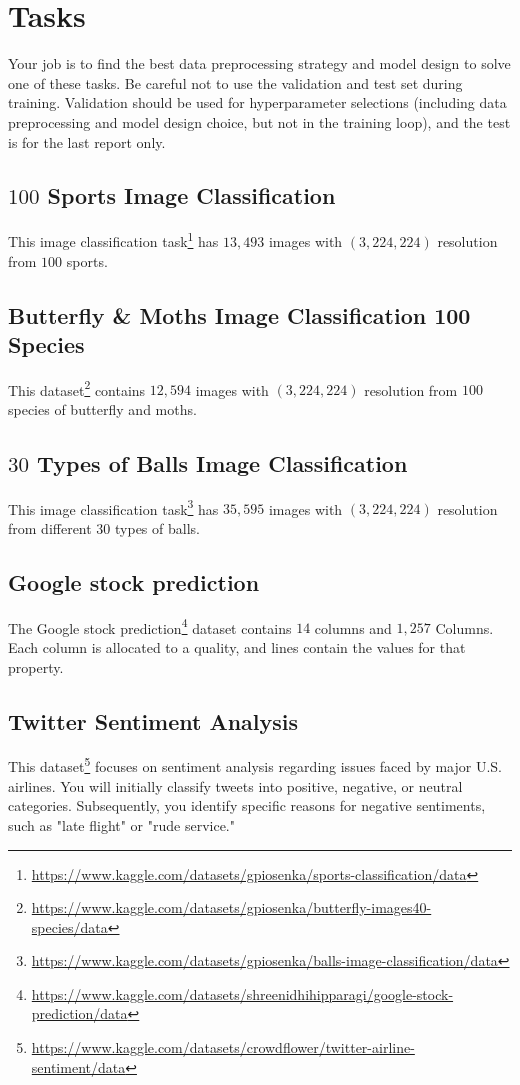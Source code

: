 \documentclass{article}
\begin{document}
\section{Tasks}

Your job is to find the best data preprocessing strategy and model design to solve one of these tasks.
Be careful not to use the validation and test set during training.
Validation should be used for hyperparameter selections (including data preprocessing and model design choice, but not in the training loop), and the test is for the last report only.

\subsection{$100$ Sports Image Classification}
This image classification task\footnote{\url{https://www.kaggle.com/datasets/gpiosenka/sports-classification/data}} has $13,493$ images with $(3, 224, 224)$ resolution from $100$ sports.

\subsection{Butterfly \& Moths Image Classification 100 Species}
This dataset\footnote{\url{https://www.kaggle.com/datasets/gpiosenka/butterfly-images40-species/data}} contains $12,594$ images with $(3, 224, 224)$ resolution from $100$ species of butterfly and moths.

\subsection{$30$ Types of Balls Image Classification}
This image classification task\footnote{\url{https://www.kaggle.com/datasets/gpiosenka/balls-image-classification/data}} has $35,595$ images with $(3, 224, 224)$ resolution from different $30$ types of balls.

\subsection{Google stock prediction}
The Google stock prediction\footnote{\url{https://www.kaggle.com/datasets/shreenidhihipparagi/google-stock-prediction/data}} dataset contains $14$ columns and $1,257$ Columns. Each column is allocated to a quality, and lines contain the values for that property.


\subsection{Twitter Sentiment Analysis}
This dataset\footnote{\url{https://www.kaggle.com/datasets/crowdflower/twitter-airline-sentiment/data}} focuses on sentiment analysis regarding issues faced by major U.S. airlines. You will initially classify tweets into positive, negative, or neutral categories. Subsequently, you identify specific reasons for negative sentiments, such as "late flight" or "rude service."
\end{document}
